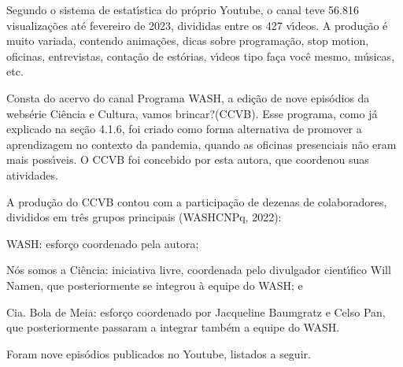 \documentclass[
12pt,		%
openright,	%
twoside,  %
a4paper,			%
chapter=TITLE,		%
english,			%
french,				%
spanish,			%
brazil				%
]{USPSC-classe/USPSC}
\begin{document}
Segundo o sistema de estat\'{\i}stica do pr\'oprio Youtube, o canal teve 56.816 visualiza\c{c}\~oes at\'e fevereiro de 2023, divididas entre os 427 v\'{\i}deos. A produ\c{c}\~ao \'e muito variada, contendo anima\c{c}\~oes, dicas sobre programa\c{c}\~ao, \textquotedbl stop motion\textquotedbl , oficinas, entrevistas, conta\c{c}\~ao de est\'orias, v\'{\i}deos tipo \textquotedbl fa\c{c}a voc\^e mesmo\textquotedbl , m\'usicas, etc.









Consta do acervo do canal \textquotedbl Programa WASH\textquotedbl , a edi\c{c}\~ao de nove epis\'odios da webs\'erie \textquotedbl Ci\^encia e Cultura, vamos brincar?\textquotedbl  (CCVB). Esse programa, como j\'a explicado na se\c{c}\~ao 4.1.6, foi criado como forma alternativa de promover a aprendizagem no contexto da pandemia, quando as oficinas presenciais n\~ao eram mais poss\'{\i}veis. O CCVB foi concebido por esta autora, que coordenou suas atividades.









A produ\c{c}\~ao do CCVB contou com a participa\c{c}\~ao de dezenas de colaboradores, divididos em tr\^es grupos principais (WASHCNPq, 2022):










\begin{alineas}
\item WASH: esfor\c{c}o coordenado pela autora;
\item \textquotedbl N\'os somos a Ci\^encia\textquotedbl : iniciativa livre, coordenada pelo divulgador cient\'{\i}fico Will Namen, que posteriormente se integrou \`a equipe do WASH; e
\item Cia. Bola de Meia: esfor\c{c}o coordenado por Jacqueline Baumgratz e Celso Pan, que posteriormente passaram  a integrar tamb\'em a equipe do WASH.
\end{alineas}

Foram nove epis\'odios publicados no Youtube, listados a seguir.
\end{document}
